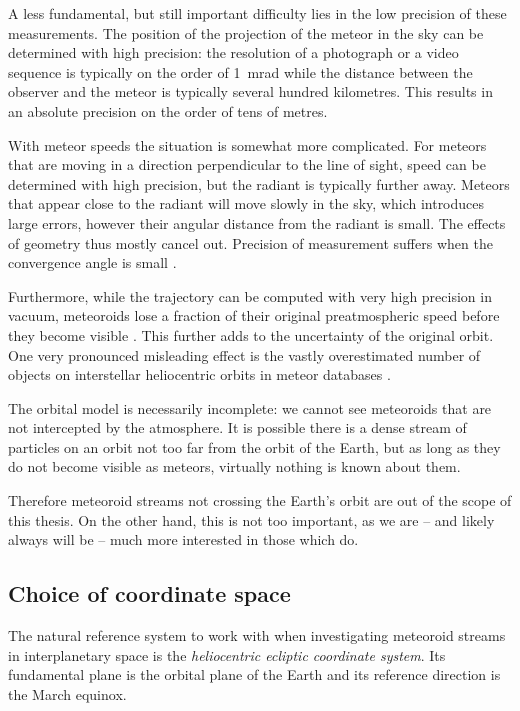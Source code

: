     A less fundamental, but still important difficulty lies in the low precision of these measurements.
    The position of the projection of the meteor in the sky can be determined with high precision:
    the resolution of a photograph or a video sequence is typically on the order of \SI{1}{\milli\radian}
    while the distance between the observer and the meteor is typically several hundred kilometres.
    This results in an absolute precision on the order of tens of metres.

    With meteor speeds the situation is somewhat more complicated.
    For meteors that are moving in a direction perpendicular to the line of sight, speed can be determined
    with high precision, but the radiant is typically further away.
    Meteors that appear close to the radiant will move slowly in the sky, which introduces large errors,
    however their angular distance from the radiant is small. The effects of geometry thus mostly cancel out.
    Precision of measurement suffers when the convergence angle is small \citep{ceplecha1987}.

    Furthermore, while the trajectory can be computed with very high precision in vacuum,
    meteoroids lose a fraction of their original preatmospheric speed before they become visible \citep{vida+2018}.
    This further adds to the uncertainty of the original orbit.
    One very pronounced misleading effect is the vastly overestimated number of objects
    on interstellar heliocentric orbits in meteor databases \citep{hajdukovajr1994}.

    The orbital model is necessarily incomplete: we cannot see meteoroids that are not intercepted by the atmosphere.
    It is possible there is a dense stream of particles on an orbit not too far from the orbit of the Earth,
    but as long as they do not become visible as meteors, virtually nothing is known about them.

    Therefore meteoroid streams not crossing the Earth's orbit are out of the scope of this thesis.
    On the other hand, this is not too important, as we are -- and likely always
    will be -- much more interested in those which do.

    \subsection{Choice of coordinate space} \label{moc}
        The natural reference system to work with when investigating meteoroid streams in interplanetary space
        is the \emph{heliocentric ecliptic coordinate system}. Its fundamental plane is the orbital plane of the Earth
        and its reference direction is the March equinox.

